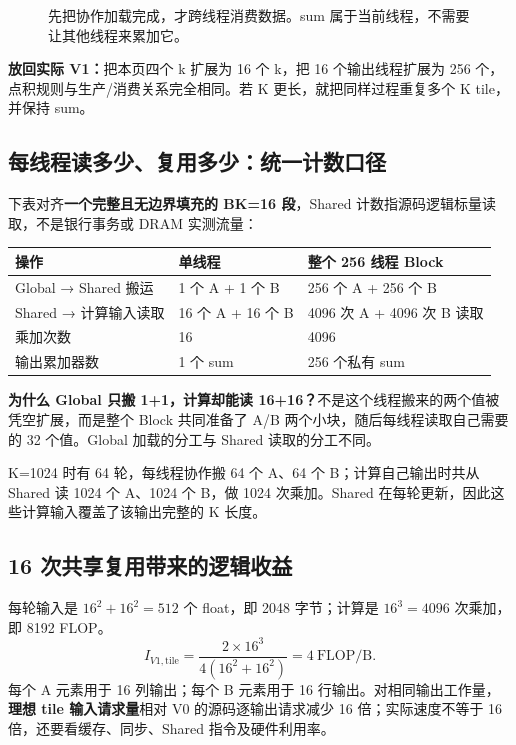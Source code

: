 \documentclass[UTF8,11pt,a4paper,fontset=fandol]{ctexart}
\newcommand{\pagebreakhere}{\clearpage}
\begin{document}
\begin{figure}[H]\centering
{}
\caption{先把协作加载完成，才跨线程消费数据。sum 属于当前线程，不需要让其他线程来累加它。}
\end{figure}

\textbf{放回实际 V1：}把本页四个 k 扩展为 16 个 k，把 16 个输出线程扩展为 256 个，点积规则与生产/消费关系完全相同。若 K 更长，就把同样过程重复多个 K tile，并保持 sum。
\pagebreakhere

\subsection{每线程读多少、复用多少：统一计数口径}
下表对齐\textbf{一个完整且无边界填充的 BK=16 段}，Shared 计数指源码逻辑标量读取，不是银行事务或 DRAM 实测流量：
\begin{table}[H]\centering
\begin{tabular}{lll}
\toprule
操作 & 单线程 & 整个 256 线程 Block\\\midrule
Global → Shared 搬运 & 1 个 A + 1 个 B & 256 个 A + 256 个 B\\
Shared → 计算输入读取 & 16 个 A + 16 个 B & 4096 次 A + 4096 次 B 读取\\
乘加次数 & 16 & 4096\\
输出累加器数 & 1 个 sum & 256 个私有 sum\\\bottomrule
\end{tabular}
\end{table}
\textbf{为什么 Global 只搬 1+1，计算却能读 16+16？}不是这个线程搬来的两个值被凭空扩展，而是整个 Block 共同准备了 A/B 两个小块，随后每线程读取自己需要的 32 个值。Global 加载的分工与 Shared 读取的分工不同。

K=1024 时有 64 轮，每线程协作搬 64 个 A、64 个 B；计算自己输出时共从 Shared 读 1024 个 A、1024 个 B，做 1024 次乘加。Shared 在每轮更新，因此这些计算输入覆盖了该输出完整的 K 长度。

\subsection{16 次共享复用带来的逻辑收益}
每轮输入是 $16^2+16^2=512$ 个 float，即 2048 字节；计算是 $16^3=4096$ 次乘加，即 8192 FLOP。
\[
I_{V1,\mathrm{tile}}=\frac{2\times16^3}{4(16^2+16^2)}=4\ \mathrm{FLOP/B}.
\]
每个 A 元素用于 16 列输出；每个 B 元素用于 16 行输出。对相同输出工作量，\textbf{理想 tile 输入请求量}相对 V0 的源码逐输出请求减少 16 倍；实际速度不等于 16 倍，还要看缓存、同步、Shared 指令及硬件利用率。
\end{document}
